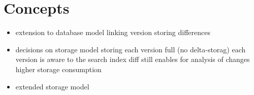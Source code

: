 \section{Concepts}

\begin{itemize}
\item extension to database model
	\subitem linking version
	\subitem storing differences
\item decisions on storage model
	\subitem storing each version full (no delta-storag)
	\subitem each version is aware to the search index
	\subitem diff still enables for analysis of changes
	\subitem higher storage consumption
\item extended storage model
\end{itemize}
